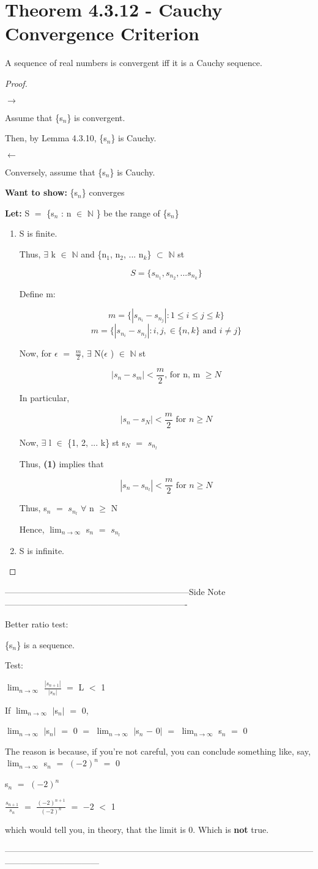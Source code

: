 \documentclass{article}
\newcommand{\mt}[1]{\ensuremath{#1}}
\newcommand\bsc[2][\DefaultOpt]{%
  \def\DefaultOpt{#2}%
  \section[#1]{#2}%
}
\newcommand{\bgpf}{\begin{proof} $ $\newline}
\newcommand{\elist}{\end{enumerate}}
\newcommand{\bilist}{\begin{enumerate}[label=\roman*)]}
\newcommand{\lt}[1]{\textbf{Let: } #1}
\newcommand{\wts}[1]{\textbf{Want to show: } #1}
\newcommand{\bpth}[1]{\textbf{(#1)}}
\newcommand{\step}[2]{\begin{equation}\tag{#2}#1\end{equation}}
\newcommand{\epf}{\end{proof}}
\newcommand{\dbs}[3]{\mt{#1_{#2_#3}}}
\newcommand{\sidenote}[1]{-----------------------------------------------------------------Side Note----------------------------------------------------------------
#1 \

---------------------------------------------------------------------------------------------------------------------------------------------}
\newcommand{\bn}{\mt{\mathbb{N}} }       %
\newcommand{\ep}{\mt{\epsilon} }         %
\newcommand{\fa}{\mt{\forall} }          %
\newcommand{\mem}{\mt{\in} }
\newcommand{\exs}{\mt{\exists} }
\newcommand{\sbs}{\mt{\subset} }         %
\newcommand{\lra}{ \mt{\longrightarrow} } %
\newcommand{\lla}{ \mt{\longleftarrow} }  %
\newcommand{\av}[1]{\mt{|}#1\mt{|}}  %
\newcommand{\bk}[1]{\{#1\}}
\newcommand{\ms}{\mt{-} }
\newcommand{\ls}{\mt{<} }
\newcommand{\lse}{\mt{\leq} }
\newcommand{\gre}{\mt{\geq} }
\newcommand{\eql}{\mt{=} }
\newcommand{\uw}[2]{#1\mt{_{#2}}}
\newcommand{\frc}[2]{\mt{\frac{#1}{#2}}}
\newcommand{\lmti}[1]{\mt{\displaystyle{\lim_{#1 \to \infty}}}}
\newcommand{\eqn}[1]{\[#1\]}
\begin{document}
\bsc{Theorem 4.3.12 - Cauchy Convergence Criterion}{

A sequence of real numbers is convergent iff it is a Cauchy sequence.

\bgpf

\lra

Assume that \bk{\uw{s}{n}} is convergent.

Then, by Lemma 4.3.10, \bk{\uw{s}{n}} is Cauchy.

\lla

Conversely, assume that \bk{\uw{s}{n}} is Cauchy.

\wts{\bk{\uw{s}{n}} converges}

\lt{S \eql \bk{\uw{s}{n} : n \mem \bn} be the range of \bk{\uw{s}{n}}}

\bilist
\item S is finite.
	
	Thus, \exs k \mem \bn and \bk{\uw{n}{1}, \uw{n}{2}, ... \uw{n}{k}} \sbs \bn st
	
	\eqn{S = \bk{\dbs{s}{n}{1}, \dbs{s}{n}{2}, ... \dbs{s}{n}{k}}}
	
	Define m:
	
	\eqn{m = \bk{|\dbs{s}{n}{i} - \dbs{s}{n}{j}| : 1 \lse i \lse j \lse k}}
	\eqn{m = \bk{|\dbs{s}{n}{i} - \dbs{s}{n}{j}| : i, j, \mem \bk{n, k}\textrm{ and }i \neq j}}
	
	Now, for \ep \eql \frc{m}{2}, \exs N(\ep) \mem \bn st
	
	\eqn{|s_n - s_m| < \frac{m}{2}\textrm{, for n, m }\gre N}
	
	In particular,
	
	\step{|s_n - s_N| < \frac{m}{2}\textrm{ for } n \gre N}{1}
	
	Now, \exs l \mem \bk{1, 2, ... k} st \uw{s}{N} \eql \dbs{s}{n}{l}
	
	Thus, \bpth{1} implies that
	
	\eqn{|\uw{s}{n} - \dbs{s}{n}{l}| < \frac{m}{2}\textrm{ for }n \gre N}
	
	Thus, \uw{s}{n} \eql \dbs{s}{n}{l} \fa n \gre N
	
	Hence, \lmti{n} \uw{s}{n} \eql \dbs{s}{n}{l}
\item S is infinite.
	
	
\elist

\epf

}

\sidenote{
Better ratio test:

\bk{\uw{s}{n}} is a sequence.

Test:

\lmti{n} \frc{|s_{n + 1}|}{|s_n|} \eql L \ls 1

If \lmti{n} \av{\uw{s}{n}} \eql 0,

\lmti{n} \av{\uw{s}{n}} \eql 0 \eql \lmti{n} \av{\uw{s}{n} \ms 0} \eql \lmti{n} \uw{s}{n} \eql 0

The reason is because, if you're not careful, you can conclude something like, say, \lmti{n} \uw{s}{n} \eql $(-2)^n$ \eql 0

\uw{s}{n} \eql $(-2)^n$

\frc{\uw{s}{n + 1}}{\uw{s}{n}} \eql $\frac{(-2)^{n + 1}}{(-2)^n}$ \eql $-2$ \ls 1

which would tell you, in theory, that the limit is 0. Which is \textbf{not} true.
}
\end{document}
